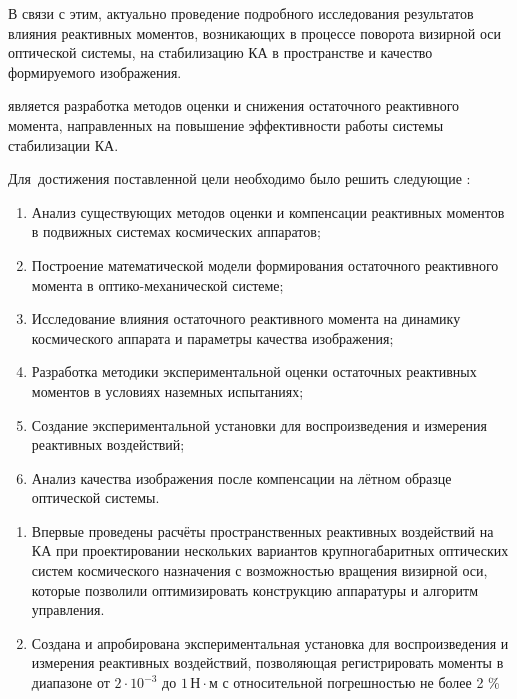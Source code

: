 В связи с этим, актуально проведение подробного исследования результатов влияния реактивных моментов, возникающих в процессе поворота визирной оси оптической системы, на стабилизацию КА в пространстве и качество формируемого изображения.



{\aim}  является разработка методов оценки и снижения остаточного реактивного момента, направленных на повышение эффективности работы системы стабилизации КА.

Для~достижения поставленной цели необходимо было решить следующие {\tasks}:
\begin{enumerate}[beginpenalty=10000] %
  \item Анализ существующих методов оценки и компенсации реактивных моментов в подвижных системах космических аппаратов;
  \item Построение математической модели формирования остаточного реактивного момента в оптико-механической системе;
  \item Исследование влияния остаточного реактивного момента на динамику космического аппарата и параметры качества изображения;
  \item Разработка методики экспериментальной оценки остаточных реактивных моментов в условиях наземных испытаниях;
  \item Создание экспериментальной установки для воспроизведения и измерения реактивных воздействий;
  \item Анализ качества изображения после компенсации на лётном образце оптической системы.
  
\end{enumerate}


{\novelty}
\begin{enumerate}[beginpenalty=10000] %
  \item Впервые проведены расчёты пространственных реактивных воздействий на КА при проектировании нескольких вариантов крупногабаритных оптических систем космического назначения с возможностью вращения визирной оси, которые позволили оптимизировать конструкцию аппаратуры и алгоритм управления.
  \item Создана и апробирована экспериментальная установка для воспроизведения и измерения реактивных воздействий, позволяющая регистрировать моменты в диапазоне от $2 \cdot 10^{-3}$ до $1\,\text{Н}\cdot\text{м}$ с относительной погрешностью не более 2 \%
\end{enumerate}

